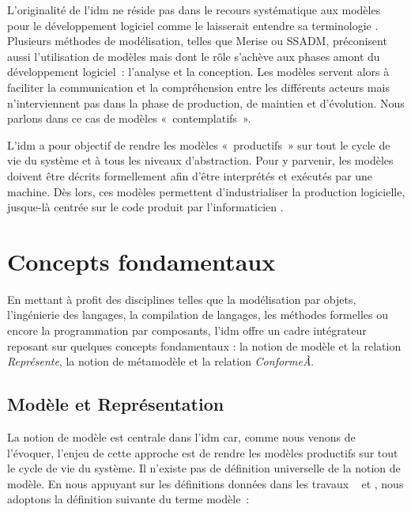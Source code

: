 L'originalité de l'\gls{idm} ne réside pas dans le recours systématique aux modèles 
pour le développement logiciel comme le laisserait entendre sa terminologie  
\cite{bezivin2004rapport}. Plusieurs méthodes de modélisation, telles que Merise 
ou SSADM, préconisent aussi l'utilisation de modèles mais dont le rôle s'achève aux 
phases amont du développement logiciel~: l'analyse et la conception. Les modèles 
servent alors à faciliter la communication et la compréhension entre les différents 
acteurs mais n'interviennent pas dans la phase de production, de maintien et 
d'évolution. Nous parlons dans ce cas de modèles «~contemplatifs~». 

L'\gls{idm} a pour objectif de rendre les modèles «~productifs~» sur tout le cycle de 
vie du système et à tous les niveaux d'abstraction. Pour y parvenir, les modèles 
doivent être décrits formellement afin d'être interprétés et exécutés par une 
machine. Dès lors, ces modèles permettent d'industrialiser la production 
logicielle, jusque-là centrée sur le code produit par l'informaticien 
\cite{bezivin2005unification}.



\section{Concepts fondamentaux}
\label{sec:concepts_idm}

En mettant à profit des disciplines telles que la modélisation par objets, 
l'ingénierie des langages, la compilation de langages, les méthodes formelles 
ou encore la programmation par composants, l'\gls{idm} offre un cadre intégrateur reposant 
sur quelques concepts fondamentaux : la notion de modèle et la relation 
\textit{Représente}, la notion de métamodèle et la relation 
\textit{ConformeÀ}.

\subsection{Modèle et Représentation}
La notion de modèle est centrale dans l'\gls{idm} car, comme nous venons de l'évoquer, 
l'enjeu de cette approche est de rendre les modèles productifs sur tout le cycle 
de vie du système. Il n'existe pas de définition universelle de la notion de 
modèle. En nous appuyant sur les définitions données dans les travaux 
\cite{minsky1967computation}~\cite{bezivin2001towards} et 
\cite{seidewitz2003models}, nous adoptons la définition suivante du terme modèle~:
\\\


